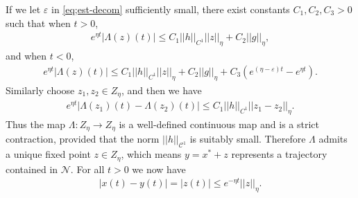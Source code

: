 \documentclass[11pt]{amsart}
\theoremstyle{definition}
\theoremstyle{remark}
\numberwithin{equation}{section}
\newcommand{\ep}{\varepsilon}
\begin{document}
If we let $\ep$ in \eqref{eq;est-decom} sufficiently small, there exist constants $C_1,C_2,C_3>0$ such that when $t>0$,
\begin{align*}
     e^{\eta t}|\Lambda(z)(t)|\le C_1||h||_{C^1}||z||_\eta+C_2||g||_\eta,
\end{align*}
and when $t<0$,
\begin{align*}
    e^{\eta t}|\Lambda(z)(t)|\le C_1||h||_{C^1}||z||_\eta+C_2||g||_\eta+C_3(e^{(\eta-\ep)t}-e^{\eta t}).
\end{align*}
Similarly choose $z_1, z_2 \in Z_{\eta}$, and then we have
\begin{align*}
    e^{\eta t}|\Lambda(z_1)(t)-\Lambda(z_2)(t)|\le C_1||h||_{C^1}||z_1 -z_2||_\eta.
\end{align*}
Thus the map $\Lambda:Z_{\eta}\rightarrow Z_{\eta}$ is a well-defined continuous map and is a strict contraction, provided that the norm $||h||_{\mathcal{C}^1}$ is suitably small. Therefore $\Lambda$ admits a unique fixed point $z\in Z_{\eta}$, which means $y=x^*+z$ represents a trajectory contained in $\mathcal{N}$. For all $t>0$ we now have
\begin{align*}
    |x(t)-y(t)|=|z(t)|\le e^{-\eta t}||z||_{\eta}.
\end{align*}

\end{document}

